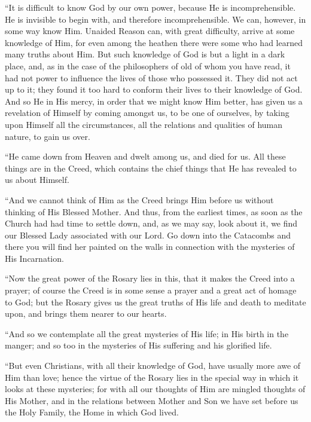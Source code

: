 ``It is difficult to know God by our own power, because He is
incomprehensible. He is invisible to begin with, and therefore
incomprehensible. We can, however, in some way know Him. Unaided
Reason can, with great difficulty, arrive at some knowledge of Him,
for even among the heathen there were some who had learned many truths
about Him. But such knowledge of God is but a light in a dark place,
and, as in the case of the philosophers of old of whom you have read,
it had not power to influence the lives of those who possessed it.
They did not act up to it; they found it too hard to conform their
lives to their knowledge of God. And so He in His mercy, in order that
we might know Him better, has given us a revelation of Himself by
coming amongst us, to be one of ourselves, by taking upon Himself all
the circumstances, all the relations and qualities of human nature, to
gain us over.

``He came down from Heaven and dwelt among us, and died for us.
All these things are in the Creed, which contains the chief things
that He has revealed to us about Himself.

``And we cannot think of Him as the Creed brings Him before us
without thinking of His Blessed Mother. And thus, from the earliest
times, as soon as the Church had had time to settle down, and, as we
may say, look about it, we find our Blessed Lady associated with our
Lord. Go down into the Catacombs and there you will find her painted
on the walls in connection with the mysteries of His Incarnation.

``Now the great power of the Rosary lies in this, that it makes
the Creed into a prayer; of course the Creed is in some sense a prayer
and a great act of homage to God; but the Rosary gives us the great
truths of His life and death to meditate upon, and brings them nearer
to our hearts.

``And so we contemplate all the great mysteries of His life; in
His birth in the manger; and so too in the mysteries of His suffering
and his glorified life.

``But even Christians, with all their knowledge of God, have
usually more awe of Him than love; hence the virtue of the Rosary lies
in the special way in which it looks at these mysteries; for with all
our thoughts of Him are mingled thoughts of His Mother, and in the
relations between Mother and Son we have set before us the Holy
Family, the Home in which God lived.

